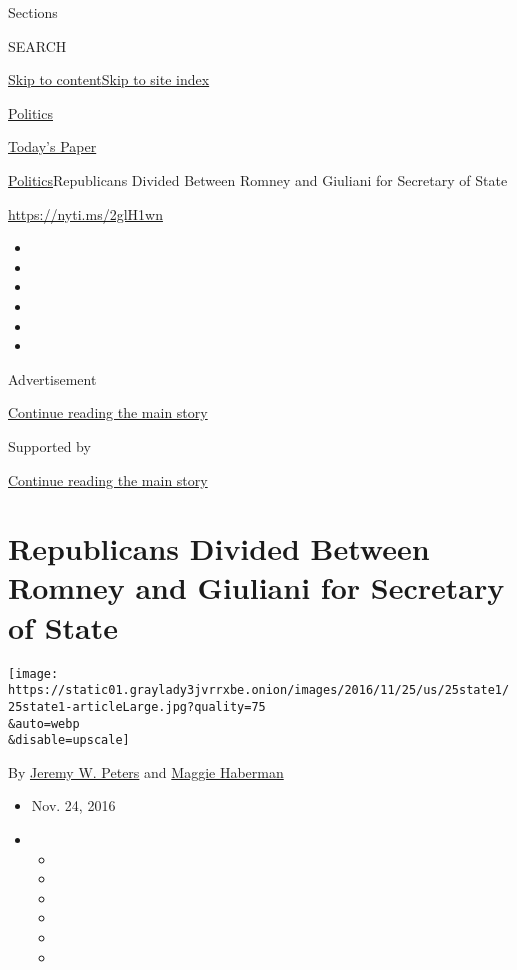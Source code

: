 Sections

SEARCH

\protect\hyperlink{site-content}{Skip to
content}\protect\hyperlink{site-index}{Skip to site index}

\href{https://www.nytimes3xbfgragh.onion/section/politics}{Politics}

\href{https://myaccount.nytimes3xbfgragh.onion/auth/login?response_type=cookie\&client_id=vi}{}

\href{https://www.nytimes3xbfgragh.onion/section/todayspaper}{Today's
Paper}

\href{/section/politics}{Politics}\textbar{}Republicans Divided Between
Romney and Giuliani for Secretary of State

\url{https://nyti.ms/2glH1wn}

\begin{itemize}
\item
\item
\item
\item
\item
\item
\end{itemize}

Advertisement

\protect\hyperlink{after-top}{Continue reading the main story}

Supported by

\protect\hyperlink{after-sponsor}{Continue reading the main story}

\hypertarget{republicans-divided-between-romney-and-giuliani-for-secretary-of-state}{%
\section{Republicans Divided Between Romney and Giuliani for Secretary
of
State}\label{republicans-divided-between-romney-and-giuliani-for-secretary-of-state}}

\texttt{[image: https://static01.graylady3jvrrxbe.onion/images/2016/11/25/us/25state1/25state1-articleLarge.jpg?quality=75\\\&auto=webp\\\&disable=upscale]}

By \href{http://www.nytimes3xbfgragh.onion/by/jeremy-w-peters}{Jeremy W.
Peters} and
\href{http://www.nytimes3xbfgragh.onion/by/maggie-haberman}{Maggie
Haberman}

\begin{itemize}
\item
  Nov. 24, 2016
\item
  \begin{itemize}
  \item
  \item
  \item
  \item
  \item
  \item
  \end{itemize}
\end{itemize}

